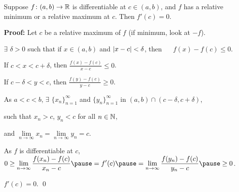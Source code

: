 \documentclass[10pt,aspectratio=149]{beamer}
\begin{document}
\begin{frame}

\begin{lemma}
Suppose $f \colon (a,b) \to {\mathbb{R}}$ is differentiable at $c \in (a,b)$,
and $f$ has
a relative minimum or a relative maximum at $c$.  Then
$f'(c) = 0$.
\end{lemma}

\pause
\textbf{Proof:}
Let $c$ be a relative maximum of $f$ \quad (if minimum, look at $-f$).

\pause
\medskip

$\exists$ $\delta > 0$ such that 
if $x \in (a,b)$ and $\left\lvert {x-c} \right\rvert < \delta$, then ~~
$f(x)-f(c) \leq 0$.

\pause
\medskip

If $c < x < c+\delta$, then
$\displaystyle
\frac{f(x)-f(c)}{x-c} \leq 0$.

\pause
\medskip

If $c-\delta < y < c$, then
$\displaystyle
\frac{f(y)-f(c)}{y-c} \geq 0$.

\pause
\medskip

As $a < c < b$, $\exists$
$\{ x_n \}_{n=1}^\infty$ and
$\{ y_n \}_{n=1}^\infty$ in $(a,b) \cap (c-\delta,c+\delta)$,

\pause
such that $x_n > c$, $y_n < c$ for all $n \in {\mathbb{N}}$,

\pause
and
$\lim\limits_{n\to\infty} x_n = \lim\limits_{n\to\infty} y_n = c$.


\pause
As $f$
is differentiable at $c$,
\quad
$\displaystyle
0 \geq \lim_{n\to\infty} \frac{f(x_n)-f(c)}{x_n-c} 
\pause
=
f'(c)
\pause
=
\lim_{n\to\infty} \frac{f(y_n)-f(c)}{y_n-c}
\pause
\geq 0$.

\pause
\medskip

\thus \quad $f'(c) = 0$.
\qed

\end{frame}
\end{document}
